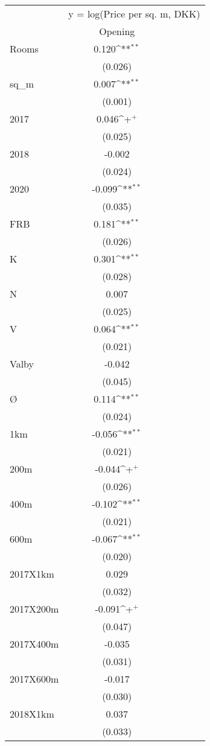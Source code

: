 {
\def\sym#1{\ifmmode^{#1}\else\(^{#1}\)\fi}
\begin{tabular}{@{\extracolsep{2pt}}l*{1}{c}@{}}
\hline\hline
& \multicolumn{3}{c}{y = log(Price per sq. m, DKK)} \\
\cline{2-4}
 & Opening \\
\hline
Rooms & 0.120\sym{**} \\
 & (0.026) \\
sq\_m & 0.007\sym{**} \\
 & (0.001) \\
2017 & 0.046\sym{+} \\
 & (0.025) \\
2018 & -0.002 \\
 & (0.024) \\
2020 & -0.099\sym{**} \\
 & (0.035) \\
FRB & 0.181\sym{**} \\
 & (0.026) \\
K & 0.301\sym{**} \\
 & (0.028) \\
N & 0.007 \\
 & (0.025) \\
V & 0.064\sym{**} \\
 & (0.021) \\
Valby & -0.042 \\
 & (0.045) \\
Ø & 0.114\sym{**} \\
 & (0.024) \\
1km & -0.056\sym{**} \\
 & (0.021) \\
200m & -0.044\sym{+} \\
 & (0.026) \\
400m & -0.102\sym{**} \\
 & (0.021) \\
600m & -0.067\sym{**} \\
 & (0.020) \\
2017X1km & 0.029 \\
 & (0.032) \\
2017X200m & -0.091\sym{+} \\
 & (0.047) \\
2017X400m & -0.035 \\
 & (0.031) \\
2017X600m & -0.017 \\
 & (0.030) \\
2018X1km & 0.037 \\
 & (0.033) \\

\end{tabular}}
